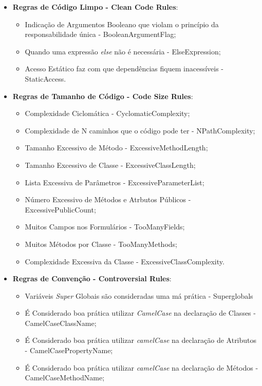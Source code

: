 \begin{itemize}
  \item \textbf{Regras de Código Limpo - Clean Code Rules}:
		\begin{itemize}
			\item Indicação de Argumentos Booleano que violam o princípio da
						responsabilidade única - BooleanArgumentFlag;
			\item Quando uma expressão \textit{else} não é necessária - ElseExpression;
			\item Acesso Estático faz com que dependências fiquem inacessíveis - StaticAccess.
		\end{itemize}
  \item \textbf{Regras de Tamanho de Código - Code Size Rules}:
		\begin{itemize}
			\item Complexidade Ciclomática - CyclomaticComplexity;
			\item Complexidade de N caminhos que o código pode ter - NPathComplexity;
			\item Tamanho Excessivo de Método - ExcessiveMethodLength;
			\item Tamanho Excessivo de Classe - ExcessiveClassLength;
			\item Lista Excessiva de Parâmetros - ExcessiveParameterList;
			\item Número Excessivo de Métodos e Atrbutos Públicos - ExcessivePublicCount;
			\item Muitos Campos nos Formulários - TooManyFields;
			\item Muitos Métodos por Classe - TooManyMethods;
			\item Complexidade Excessiva da Classe - ExcessiveClassComplexity.
		\end{itemize}
  \item \textbf{Regras de Convenção - Controversial Rules}:
		\begin{itemize}
			\item Variáveis \textit{Super} Globais são consideradas uma má prática  -
            Superglobals
			\item É Considerado boa prática utilizar \textit{CamelCase} na declaração
            de Classes - CamelCaseClassName;
			\item É Considerado boa prática utilizar \textit{camelCase} na declaração
            de Atributos - CamelCasePropertyName;
			\item É Considerado boa prática utilizar \textit{camelCase} na declaração
            de Métodos - CamelCaseMethodName;

\end{itemize}
\end{itemize}
